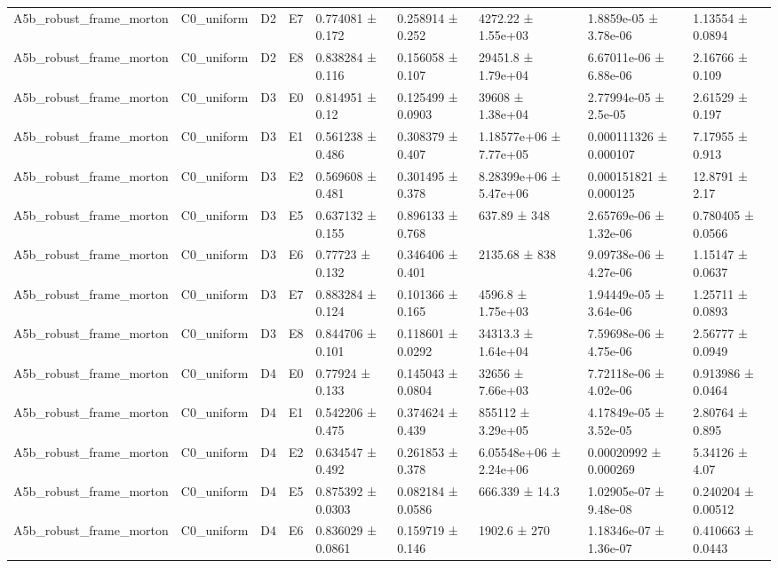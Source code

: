 \begin{table}
\begin{tabular}{lllllllll}
A5b\_robust\_frame\_morton & C0\_uniform & D2 & E7 & 0.774081 ± 0.172 & 0.258914 ± 0.252 & 4272.22 ± 1.55e+03 & 1.8859e-05 ± 3.78e-06 & 1.13554 ± 0.0894 \\
A5b\_robust\_frame\_morton & C0\_uniform & D2 & E8 & 0.838284 ± 0.116 & 0.156058 ± 0.107 & 29451.8 ± 1.79e+04 & 6.67011e-06 ± 6.88e-06 & 2.16766 ± 0.109 \\
A5b\_robust\_frame\_morton & C0\_uniform & D3 & E0 & 0.814951 ± 0.12 & 0.125499 ± 0.0903 & 39608 ± 1.38e+04 & 2.77994e-05 ± 2.5e-05 & 2.61529 ± 0.197 \\
A5b\_robust\_frame\_morton & C0\_uniform & D3 & E1 & 0.561238 ± 0.486 & 0.308379 ± 0.407 & 1.18577e+06 ± 7.77e+05 & 0.000111326 ± 0.000107 & 7.17955 ± 0.913 \\
A5b\_robust\_frame\_morton & C0\_uniform & D3 & E2 & 0.569608 ± 0.481 & 0.301495 ± 0.378 & 8.28399e+06 ± 5.47e+06 & 0.000151821 ± 0.000125 & 12.8791 ± 2.17 \\
A5b\_robust\_frame\_morton & C0\_uniform & D3 & E5 & 0.637132 ± 0.155 & 0.896133 ± 0.768 & 637.89 ± 348 & 2.65769e-06 ± 1.32e-06 & 0.780405 ± 0.0566 \\
A5b\_robust\_frame\_morton & C0\_uniform & D3 & E6 & 0.77723 ± 0.132 & 0.346406 ± 0.401 & 2135.68 ± 838 & 9.09738e-06 ± 4.27e-06 & 1.15147 ± 0.0637 \\
A5b\_robust\_frame\_morton & C0\_uniform & D3 & E7 & 0.883284 ± 0.124 & 0.101366 ± 0.165 & 4596.8 ± 1.75e+03 & 1.94449e-05 ± 3.64e-06 & 1.25711 ± 0.0893 \\
A5b\_robust\_frame\_morton & C0\_uniform & D3 & E8 & 0.844706 ± 0.101 & 0.118601 ± 0.0292 & 34313.3 ± 1.64e+04 & 7.59698e-06 ± 4.75e-06 & 2.56777 ± 0.0949 \\
A5b\_robust\_frame\_morton & C0\_uniform & D4 & E0 & 0.77924 ± 0.133 & 0.145043 ± 0.0804 & 32656 ± 7.66e+03 & 7.72118e-06 ± 4.02e-06 & 0.913986 ± 0.0464 \\
A5b\_robust\_frame\_morton & C0\_uniform & D4 & E1 & 0.542206 ± 0.475 & 0.374624 ± 0.439 & 855112 ± 3.29e+05 & 4.17849e-05 ± 3.52e-05 & 2.80764 ± 0.895 \\
A5b\_robust\_frame\_morton & C0\_uniform & D4 & E2 & 0.634547 ± 0.492 & 0.261853 ± 0.378 & 6.05548e+06 ± 2.24e+06 & 0.00020992 ± 0.000269 & 5.34126 ± 4.07 \\
A5b\_robust\_frame\_morton & C0\_uniform & D4 & E5 & 0.875392 ± 0.0303 & 0.082184 ± 0.0586 & 666.339 ± 14.3 & 1.02905e-07 ± 9.48e-08 & 0.240204 ± 0.00512 \\
A5b\_robust\_frame\_morton & C0\_uniform & D4 & E6 & 0.836029 ± 0.0861 & 0.159719 ± 0.146 & 1902.6 ± 270 & 1.18346e-07 ± 1.36e-07 & 0.410663 ± 0.0443 \\

\end{tabular}
\end{table}
